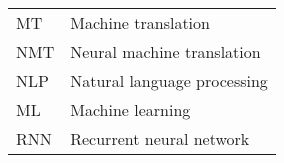 
\begin{table}[h]
\begin{tabular}{l | l}
    MT   & Machine translation  \\
    NMT  & Neural machine translation \\
    NLP  & Natural language processing \\
    ML   & Machine learning \\
    RNN  & Recurrent neural network \\
\end{tabular}
\end{table}
